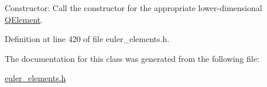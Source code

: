 Constructor\+: Call the constructor for the appropriate lower-\/dimensional \hyperlink{classoomph_1_1QElement}{Q\+Element}. 



Definition at line 420 of file euler\+\_\+elements.\+h.



The documentation for this class was generated from the following file\+:\begin{DoxyCompactItemize}
\item 
\hyperlink{euler__elements_8h}{euler\+\_\+elements.\+h}\end{DoxyCompactItemize}
